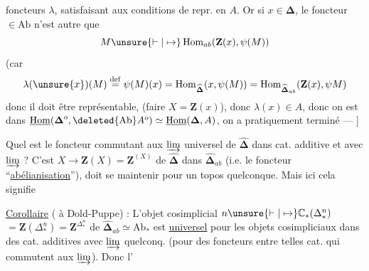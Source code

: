foncteurs $\lambda$, satisfaisant aux conditions de
repr.  en $A$. Or si $x\in\boldsymbol\Delta$, le foncteur 
$\in\mathrm{Ab}$ n'est autre que
\[
M\unsure{\vdash|\mapsto}\operatorname{Hom}_{ab}(\mathbf Z(x),\psi(M))
\]
(car
\[
\lambda(\unsure{x})(M)\overset{\mathrm{def}}=\psi(M)(x)
=\operatorname{Hom}_{\widehat{\boldsymbol\Delta}}(x,\psi(M))
=\operatorname{Hom}_{\widehat{\boldsymbol\Delta}_{ab}}(\mathbf Z(x),\psi M)
\]
donc il doit être représentable,  (faire $X
=\mathbf Z(x)$), donc $\lambda(x)\in A$, donc on est
dans $\underline{\operatorname{Hom}}(\boldsymbol\Delta^o,\deleted{\mathrm{Ab}}A^o)\simeq\underline{\operatorname{Hom}}(\boldsymbol\Delta,A)$,
on a pratiquement terminé --- ]

Quel est  le foncteur commutant aux
$\varinjlim$  universel de $\widehat{\boldsymbol\Delta}$ dans cat.
additive et avec $\varinjlim$ ? C'est
$X\longrightarrow\mathbf Z(X)=\mathbf Z^{(X)}$ de $\widehat{\boldsymbol\Delta}$ dans $\widehat{\boldsymbol\Delta}_{ab}$
(i.e. le foncteur ``\uline{abélianisation}''), 
doit se maintenir pour un topos quelconque.
Mais ici  cela signifie

\uline{Corollaire} ( à Dold-Puppe) :  L'objet
cosimplicial  $n\unsure{\vdash|\mapsto}\mathbb C_*(\Delta^n_*)$
$=\mathbf Z(\Delta^n_*)=\mathbf Z^{\Delta^n_*}$ de $\widehat{\boldsymbol\Delta}_{ab}\simeq\mathrm{Ab}_*$
est \uline{universel} pour les objets cosimpliciaux
dans des cat. additives avec
$\varinjlim$ quelconq. (pour des foncteurs entre
telles cat. qui commutent aux
$\varinjlim$). Donc l'
